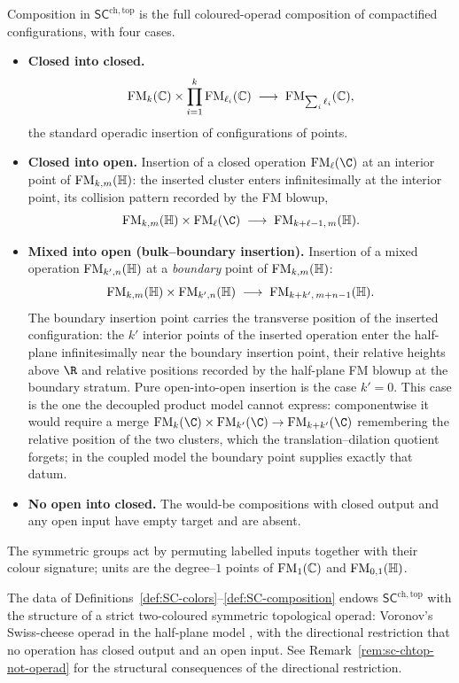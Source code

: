 \begin{definition}[Composition]
\label{def:SC-composition}
Composition in $\mathsf{SC}^{\mathrm{ch,top}}$ is the full
coloured-operad composition of compactified configurations, with
four cases.
\begin{itemize}
 \item \textbf{Closed into closed.}
 \[
 \mathrm{FM}_k(\mathbb C)\times\prod_{i=1}^k\mathrm{FM}_{\ell_i}(\mathbb C)
 \;\longrightarrow\;
 \mathrm{FM}_{\sum_i\ell_i}(\mathbb C),
 \]
 the standard operadic insertion of configurations of points.
 \item \textbf{Closed into open.} Insertion of a closed operation
 $\FM_{\ell}(\C)$ at an interior point of
 $\mathrm{FM}_{k,m}(\mathbb H)$: the inserted cluster enters
 infinitesimally at the interior point, its collision pattern
 recorded by the FM blowup,
 \[
 \FM_{k,m}(\mathbb H)\times\FM_{\ell}(\C)
 \;\longrightarrow\;
 \FM_{k+\ell-1,\,m}(\mathbb H).
 \]
 \item \textbf{Mixed into open (bulk--boundary insertion).}
 Insertion of a mixed operation
 $\mathrm{FM}_{k',n}(\mathbb H)$ at a \emph{boundary} point of
 $\mathrm{FM}_{k,m}(\mathbb H)$:
 \[
 \mathrm{FM}_{k,m}(\mathbb H)\times\mathrm{FM}_{k',n}(\mathbb H)
 \;\longrightarrow\;
 \mathrm{FM}_{k+k',\,m+n-1}(\mathbb H).
 \]
 The boundary insertion point carries the transverse position of
 the inserted configuration: the $k'$ interior points of the
 inserted operation enter the half-plane infinitesimally near the
 boundary insertion point, their relative heights above $\R$ and
 relative positions recorded by the half-plane FM blowup at the
 boundary stratum. Pure open-into-open insertion is the case
 $k' = 0$. This case is the one the decoupled product model
 cannot express: componentwise it would require a merge
 $\FM_k(\C)\times\FM_{k'}(\C)\to\FM_{k+k'}(\C)$ remembering the
 relative position of the two clusters, which the
 translation--dilation quotient forgets; in the coupled model the
 boundary point supplies exactly that datum.
 \item \textbf{No open into closed.} The would-be compositions with
 closed output and any open input have empty target and are
 absent.
\end{itemize}
The symmetric groups act by permuting labelled inputs together with
their colour signature; units are the degree--$1$ points of
$\mathrm{FM}_1(\mathbb C)$ and $\mathrm{FM}_{0,1}(\mathbb H)$.
\end{definition}

\begin{proposition}
\label{prop:SC-well-defined}
The data of Definitions~\ref{def:SC-colors}--\ref{def:SC-composition}
endows $\mathsf{SC}^{\mathrm{ch,top}}$ with the structure of a
strict two-coloured symmetric topological operad: Voronov's
Swiss-cheese operad in the half-plane model
\cite{Voronov1998}, with the directional restriction that no
operation has closed output and an open input.
See Remark~\ref{rem:sc-chtop-not-operad} for the structural
consequences of the directional restriction.
\end{proposition}

